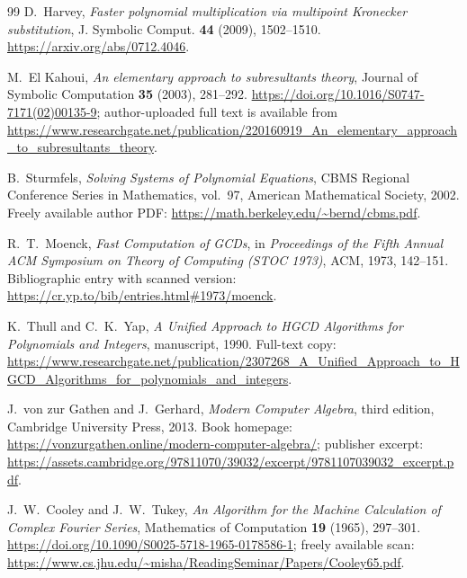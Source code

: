 \documentclass[11pt]{book}
\theoremstyle{definition}
\begin{document}
\begin{thebibliography}{99}
D.~Harvey,
\emph{Faster polynomial multiplication via multipoint Kronecker substitution},
J. Symbolic Comput. \textbf{44} (2009), 1502--1510.
\newline
\url{https://arxiv.org/abs/0712.4046}.



M.~El Kahoui,
\emph{An elementary approach to subresultants theory},
Journal of Symbolic Computation \textbf{35} (2003), 281--292.
\newline
\url{https://doi.org/10.1016/S0747-7171(02)00135-9};
author-uploaded full text is available from
\url{https://www.researchgate.net/publication/220160919_An_elementary_approach_to_subresultants_theory}.


B.~Sturmfels,
\emph{Solving Systems of Polynomial Equations},
CBMS Regional Conference Series in Mathematics, vol.~97,
American Mathematical Society, 2002.
\newline
Freely available author PDF:
\url{https://math.berkeley.edu/~bernd/cbms.pdf}.

R.~T.~Moenck,
\emph{Fast Computation of GCDs},
in \emph{Proceedings of the Fifth Annual ACM Symposium on Theory of Computing
(STOC 1973)}, ACM, 1973, 142--151.
\newline
Bibliographic entry with scanned version:
\url{https://cr.yp.to/bib/entries.html#1973/moenck}.

K.~Thull and C.~K.~Yap,
\emph{A Unified Approach to HGCD Algorithms for Polynomials and Integers},
manuscript, 1990.
\newline
Full-text copy:
\url{https://www.researchgate.net/publication/2307268_A_Unified_Approach_to_HGCD_Algorithms_for_polynomials_and_integers}.

J.~von zur Gathen and J.~Gerhard,
\emph{Modern Computer Algebra}, third edition,
Cambridge University Press, 2013.
\newline
Book homepage:
\url{https://vonzurgathen.online/modern-computer-algebra/};
publisher excerpt:
\url{https://assets.cambridge.org/97811070/39032/excerpt/9781107039032_excerpt.pdf}.


J.~W.~Cooley and J.~W.~Tukey,
\emph{An Algorithm for the Machine Calculation of Complex Fourier Series},
Mathematics of Computation \textbf{19} (1965), 297--301.
\newline
\url{https://doi.org/10.1090/S0025-5718-1965-0178586-1};
freely available scan:
\url{https://www.cs.jhu.edu/~misha/ReadingSeminar/Papers/Cooley65.pdf}.


\end{thebibliography}
\end{document}
